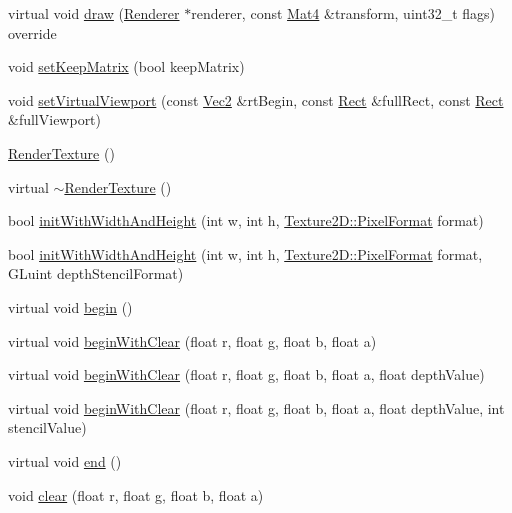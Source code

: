 \begin{DoxyCompactItemize}
\item 
virtual void \hyperlink{classRenderTexture_a354c10ae4393f186324000e0fda6a9eb}{draw} (\hyperlink{classRenderer}{Renderer} $\ast$renderer, const \hyperlink{classMat4}{Mat4} \&transform, uint32\+\_\+t flags) override
\item 
void \hyperlink{classRenderTexture_a9cfc0e640f5e3ddf666bd3b7b735991a}{set\+Keep\+Matrix} (bool keep\+Matrix)
\item 
void \hyperlink{classRenderTexture_a0b508deeb3efa8522314973a54e97815}{set\+Virtual\+Viewport} (const \hyperlink{classVec2}{Vec2} \&rt\+Begin, const \hyperlink{classRect}{Rect} \&full\+Rect, const \hyperlink{classRect}{Rect} \&full\+Viewport)
\item 
\hyperlink{classRenderTexture_a470aba8ca16bbe016a1db3cdce7ddf01}{Render\+Texture} ()
\item 
virtual \hyperlink{classRenderTexture_a09968448696504585c6dd61203f2c5b9}{$\sim$\+Render\+Texture} ()
\item 
bool \hyperlink{classRenderTexture_a77d3e22af2c64225b1852653fc4c5452}{init\+With\+Width\+And\+Height} (int w, int h, \hyperlink{classTexture2D_a45d9d8bb5a0669def36bbdfbfb91d220}{Texture2\+D\+::\+Pixel\+Format} format)
\item 
bool \hyperlink{classRenderTexture_a1bceb3ba56e1b6353fa9f9e032ed0fc7}{init\+With\+Width\+And\+Height} (int w, int h, \hyperlink{classTexture2D_a45d9d8bb5a0669def36bbdfbfb91d220}{Texture2\+D\+::\+Pixel\+Format} format, G\+Luint depth\+Stencil\+Format)
\item 
virtual void \hyperlink{classRenderTexture_a24a91b875c53b5344c64d8d8c5145b8f}{begin} ()
\item 
virtual void \hyperlink{classRenderTexture_a25689a1dd20ba0fb03728ad923d058cf}{begin\+With\+Clear} (float r, float g, float b, float a)
\item 
virtual void \hyperlink{classRenderTexture_a826696c82c6d91dc26f1e8bef43cdcec}{begin\+With\+Clear} (float r, float g, float b, float a, float depth\+Value)
\item 
virtual void \hyperlink{classRenderTexture_a2dd812e25a43e6aa06979f90792da455}{begin\+With\+Clear} (float r, float g, float b, float a, float depth\+Value, int stencil\+Value)
\item 
virtual void \hyperlink{classRenderTexture_aefbf3e20040da244af3e87abd978b8d9}{end} ()
\item 
void \hyperlink{classRenderTexture_a37c190ea856c1b96af82caacca37e9ec}{clear} (float r, float g, float b, float a)
\item 

\end{DoxyCompactItemize}
